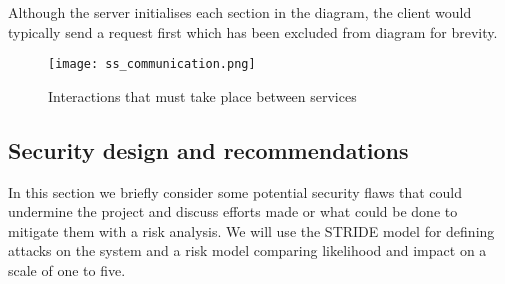 \documentclass{entcs}
\begin{document}
Although the server initialises each section in the diagram, the client would typically send a request first which has been excluded from diagram for brevity. 

\begin{figure}[h!]
    \centering
    \texttt{[image: ss\_communication.png]}
    \caption{Interactions that must take place between services}
    \label{fig:communication}
\end{figure}

\subsection{Security design and recommendations} \label{sec: security design}
In this section we briefly consider some potential security flaws that could undermine the project and discuss efforts made or what could be done to mitigate them with a risk analysis. We will use the STRIDE model \cite{STRIDE} for defining attacks on the system and a risk model comparing likelihood and impact on a scale of one to five.
\end{document}
